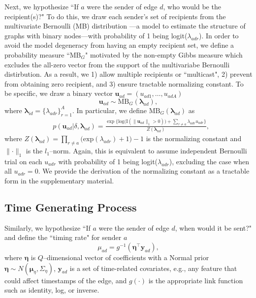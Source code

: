 \documentclass[12pt]{article}
\begin{document}
Next, we hypothesize ``If $a$ were the sender of edge $d$, who would be the recipient(s)?" To do this, we draw each sender's set of recipients from the multivariate Bernoulli (MB) distribution \citep{dai2013multivariate}---a model to estimate the structure of graphs with binary nodes---with probability of 1 being logit($\lambda_{adr}$). In order to avoid the model degeneracy from having an empty recipient set, we define a probability measure ``MB$_{G}$" motivated by the non-empty Gibbs measure \citep{fellows2017removing} which excludes the all-zero vector from the support of the multivariabe Bernoulli distirbution. As a result, we 1) allow multiple recipients or ``multicast", 2) prevent from obtaining zero recipient, and 3) ensure tractable normalizing constant. To be specific, we draw a binary vector $\boldsymbol{u}_{ad}= (u_{ad1},
\ldots, u_{adA})$ 
\begin{equation} \boldsymbol{u}_{ad}  \sim
\mbox{MB}_{G}(\boldsymbol{\lambda}_{ad}),
\end{equation}
where $\boldsymbol{\lambda}_{id}= \{\lambda_{adr}\}_{r=1}^A$. In particular, we define $\mbox{MB}_{G}(\boldsymbol{\lambda}_{ad})$ as
\begin{equation}
\begin{aligned}
&p(\boldsymbol{u}_{ad}|\delta, \boldsymbol{\lambda}_{ad}) = \frac{\exp\Big\{\mbox{log}\big(\text{I}( \lVert \boldsymbol{u}_{ad}\rVert_1 > 0 )\big) + \sum_{r\neq a} \lambda_{adr}u_{adr}\Big\}}{Z(\boldsymbol{\lambda}_{ad})} ,
\end{aligned}
\label{eqn:Gibbs}
\end{equation}
where $Z(\boldsymbol{\lambda}_{ad})= \prod_{r \neq a} \big(\mbox{exp}(\lambda_{adr}) + 1\big)-1$ is the normalizing constant and $\lVert \cdot \rVert_1$ is the $l_1$--norm. Again, this is equivalent to assume independent Bernoulli trial on each $u_{adr}$ with probability of 1 being logit($\lambda_{adr}$), excluding the case when all $u_{adr}=0$. We provide the derivation of the normalizing constant as a tractable form in the supplementary material. 


\subsection{Time Generating Process}\label{subsec:Time}
Similarly, we hypothesize ``If $a$ were the sender of edge $d$, when would it be sent?" and define the ``timing rate" for sender $a$
\begin{equation}
\mu_{ad} = g^{-1}(\boldsymbol{\eta}^\top \boldsymbol{y}_{ad}),
\end{equation}
where $\boldsymbol{\eta}$ is $Q$--dimensional vector of coefficients with a Normal prior $\boldsymbol{\eta} \sim N(\boldsymbol{\mu}_\eta,\Sigma_\eta)$, $\boldsymbol{y}_{ad}$ is a set of time-related covariates, e.g., any feature that could affect timestamps of the edge, and $g(\cdot)$ is the appropriate link function such as identity, log, or inverse. 
\end{document}
